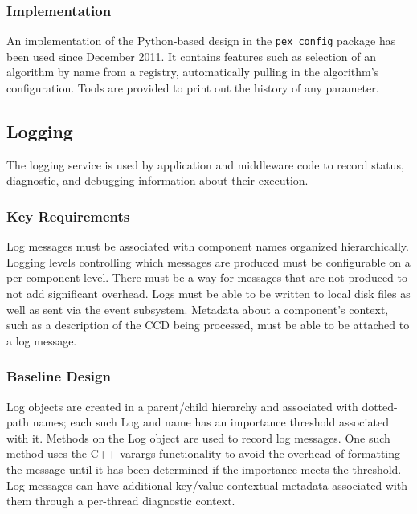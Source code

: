 \documentclass[DM,toc]{lsstdoc}
\begin{document}
\subsubsection{Implementation}\label{configuration-implementation}

An implementation of the Python-based design in the \texttt{pex\_config}
package has been used since December 2011. It contains features such as
selection of an algorithm by name from a registry, automatically pulling in the
algorithm's configuration. Tools are provided to print out the history of any
parameter.


\subsection{Logging}\label{logging}

The logging service is used by application and middleware code to record
status, diagnostic, and debugging information about their execution.

\subsubsection{Key Requirements}\label{logging-reqs}

Log messages must be associated with component names organized
hierarchically. Logging levels controlling which messages are produced
must be configurable on a per-component level. There must be a way for
messages that are not produced to not add significant overhead.
Logs must be able to
be written to local disk files as well as sent via the event subsystem.
Metadata about a component's context, such as a description of the CCD
being processed, must be able to be attached to a log message.

\subsubsection{Baseline Design}\label{logging-design}

Log objects are created in a parent/child hierarchy and associated with
dotted-path names; each such Log and name has an importance threshold
associated with it. Methods on the Log object are used to record log messages.
One such method uses the C++ varargs functionality to avoid the overhead of
formatting the message until it has been determined if the importance meets the
threshold. Log messages can have additional key/value contextual metadata
associated with them through a per-thread diagnostic context.
\end{document}
